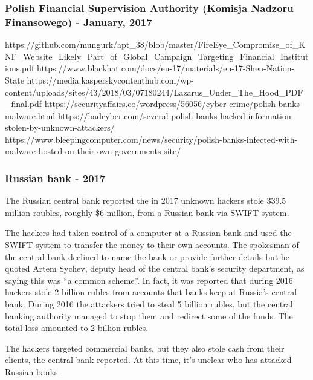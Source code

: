 \documentclass[12pt]{article}
\begin{document}
    \subsubsection{Polish Financial Supervision Authority (Komisja Nadzoru Finansowego) - January, 2017}
        
        https://github.com/mungurk/apt_38/blob/master/FireEye_Compromise_of_KNF_Website_Likely_Part_of_Global_Campaign_Targeting_Financial_Institutions.pdf
        https://www.blackhat.com/docs/eu-17/materials/eu-17-Shen-Nation-State%
        https://media.kasperskycontenthub.com/wp-content/uploads/sites/43/2018/03/07180244/Lazarus_Under_The_Hood_PDF_final.pdf
        https://securityaffairs.co/wordpress/56056/cyber-crime/polish-banks-malware.html
        https://badcyber.com/several-polish-banks-hacked-information-stolen-by-unknown-attackers/
        https://www.bleepingcomputer.com/news/security/polish-banks-infected-with-malware-hosted-on-their-own-governments-site/
        
    
    \subsubsection{Russian bank - 2017}
        
        The Russian central bank reported the in 2017 unknown hackers stole 339.5 million roubles, roughly \$6 million, from a Russian bank via SWIFT system. 
        
        The hackers had taken control of a computer at a Russian bank and used the SWIFT system to transfer the money to their own accounts. 
        The spokesman of the central bank declined to name the bank or provide further details but he quoted Artem Sychev, deputy head of the central bank’s security department, as saying this was “a common scheme”. In fact, it was reported that during 2016 hackers stole 2 billion rubles from accounts that banks keep at Russia's central bank. During 2016 the attackers tried to steal 5 billion rubles, but the central banking authority managed to stop them and redirect some of the funds. The total loss amounted to 2 billion rubles.
        
        The hackers targeted commercial banks, but they also stole cash from their clients, the central bank reported. At this time, it's unclear who has attacked Russian banks.\cite{HackersStoleMillion2018}\cite{UnknownHackersStole2018}
        
\end{document}
